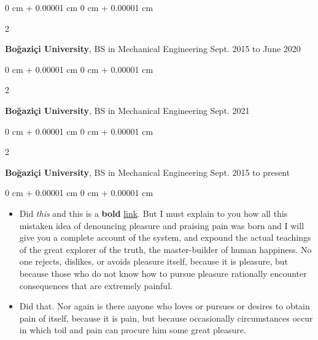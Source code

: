 \documentclass[10pt, letterpaper]{article}
\newenvironment{highlights}{
    \begin{itemize}[
        topsep=0.10 cm,
        parsep=0.10 cm,
        partopsep=0pt,
        itemsep=0pt,
        leftmargin=0 cm + 10pt
    ]
}{
    \end{itemize}
} %
\newenvironment{onecolentry}{
    \begin{adjustwidth}{
        0 cm + 0.00001 cm
    }{
        0 cm + 0.00001 cm
    }
}{
    \end{adjustwidth}
} %
\newenvironment{twocolentry}[2][]{
    \onecolentry
    \def\secondColumn{#2}
    \setcolumnwidth{\fill, 4.5 cm}
    \begin{paracol}{2}
}{
    \switchcolumn \raggedleft \secondColumn
    \end{paracol}
    \endonecolentry
} %
\begin{document}
        \vspace{0.2 cm}

        \begin{twocolentry}{
            Sept. 2015 to June 2020
        }
            \textbf{Boğaziçi University}, BS in Mechanical Engineering\end{twocolentry}



        \vspace{0.2 cm}

        \begin{twocolentry}{
            Sept. 2021
        }
            \textbf{Boğaziçi University}, BS in Mechanical Engineering\end{twocolentry}



        \vspace{0.2 cm}

        \begin{twocolentry}{
            Sept. 2015 to present
        }
            \textbf{Boğaziçi University}, BS in Mechanical Engineering\end{twocolentry}

        \vspace{0.10 cm}
        \begin{onecolentry}
            \begin{highlights}
                \item Did \textit{this} and this is a \textbf{bold} \href{https://example.com}{link}. But I must explain to you how all this mistaken idea of denouncing pleasure and praising pain was born and I will give you a complete account of the system, and expound the actual teachings of the great explorer of the truth, the master-builder of human happiness. No one rejects, dislikes, or avoids pleasure itself, because it is pleasure, but because those who do not know how to pursue pleasure rationally encounter consequences that are extremely painful.
                \item Did that. Nor again is there anyone who loves or pursues or desires to obtain pain of itself, because it is pain, but because occasionally circumstances occur in which toil and pain can procure him some great pleasure.
            \end{highlights}
        \end{onecolentry}


        \vspace{0.2 cm}
\end{document}

